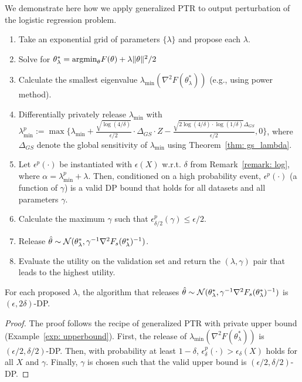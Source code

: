 \begin{example}
We demonstrate here how we apply  generalized PTR to  output perturbation of the logistic regression problem.  
	\begin{enumerate}
		\item Take an exponential grid of parameters $\{\lambda\}$ and propose each $\lambda$.
		\item Solve for $\theta_{\lambda}^*  = \text{argmin}_{\theta} F(\theta) + \lambda \|\theta\|^2/2$
		\item Calculate the smallest eigenvalue $\lambda_{\min}(\nabla^2F(\theta_\lambda^*))$ (e.g., using power method).
		\item Differentially privately release $\lambda_{\min}$ with $\lambda_{\min}^p:= \max\{\lambda_{\min}+ \frac{\sqrt{\log(4/\delta)}}{\epsilon/2}\cdot \Delta_{GS}\cdot Z -\frac{\sqrt{2\log(4/\delta) \cdot \log(1/\delta)}\Delta_{GS}}{\epsilon/2},0\}$, where $\Delta_{GS}$ denote the global sensitivity of $\lambda_{\min}$
		using Theorem~\ref{thm: gs_lambda}.
		\item Let $\epsilon^p(\cdot)$ be instantiated with $\epsilon(X)$ w.r.t. $\delta$ from Remark~\ref{remark: log}, where $\alpha = \lambda_{\min}^p +\lambda$. 
		Then, conditioned on a high probability event, $\epsilon^p(\cdot)$ (a function of $\gamma$) is a valid DP bound that holds for all datasets and all parameters $\gamma$.
		\item  Calculate the maximum $\gamma$ such that $\epsilon_{\delta/2}^p(\gamma)\leq \epsilon/2$.
		\item Release  $\hat{\theta}  \sim \mathcal{N}(\theta_\lambda^*, \gamma^{-1}\nabla^2 F_s(\theta_\lambda^*)^{-1})$.
		\item Evaluate the utility on the validation set and return the $(\lambda, \gamma)$ pair that leads to the highest utility.
	\end{enumerate}
\begin{theorem}
For each proposed $\lambda$, the algorithm that releases  $\hat{\theta}  \sim \mathcal{N}(\theta_\lambda^*, \gamma^{-1}\nabla^2 F_s(\theta_\lambda^*)^{-1})$ is $(\epsilon, 2\delta)$-DP.
\end{theorem}
\begin{proof}
The proof  follows the recipe of generalized PTR with private upper bound (Example~\ref{exp: upperbound}). First, the release of $\lambda_{\min}(\nabla^2 F(\theta_\lambda^*))$ is $(\epsilon/2, \delta/2)$-DP. Then, with probability at least $1-\delta$, $\epsilon_\delta^p(\cdot)> \epsilon_\delta(X)$ holds for all $X$ and $\gamma$.  Finally, $\gamma$ is chosen such that the valid upper bound is $(\epsilon/2, \delta/2)$-DP.
\end{proof}


\end{example}
